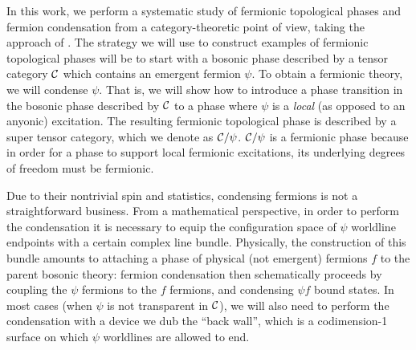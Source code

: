 In this work, we perform a systematic study of fermionic topological phases and fermion condensation from a category-theoretic
point of view, taking the approach of \cite{Walker2014,Walker2014}. 
The strategy we will use to construct examples of fermionic topological phases will be to start with 
a bosonic phase described by a tensor category $\mathcal{C}$
which contains an emergent fermion $\psi$.
To obtain a fermionic theory, we will condense $\psi$.
That is, we will show how to introduce a phase transition in the bosonic phase 
described by $\mathcal{C}$ to a phase where $\psi$ is a {\it local} (as opposed to an anyonic) excitation.
The resulting fermionic topological phase is described by a super tensor category, which we denote
as $\mathcal{C} / \psi$.
$\mathcal{C}/\psi$ is a fermionic phase because in order for a phase to support local fermionic excitations, 
its underlying degrees of freedom must be fermionic. 

Due to their nontrivial spin and statistics, condensing fermions is not a straightforward business. 
From a mathematical perspective, in order to perform the condensation it is necessary to equip the configuration 
space of $\psi$ worldline endpoints with a certain complex line bundle. 
Physically, the construction of this bundle amounts to attaching a phase of physical (not emergent) fermions $f$ 
to the parent bosonic theory: 
fermion condensation then schematically proceeds by coupling the $\psi$ fermions to 
the $f$ fermions, and condensing $\psi f$ bound states. 
In most cases (when $\psi$ is not transparent in $\mathcal{C}$), we will also need to perform 
the condensation with a device we dub the ``back wall'', which is a codimension-1 surface 
on which $\psi$ worldlines are allowed to end. 


